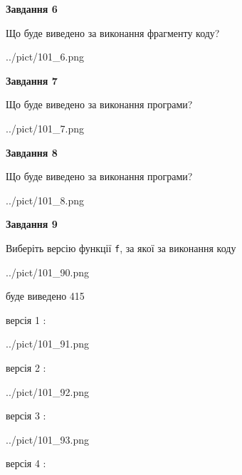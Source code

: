 \documentclass[12pt, ukrainian]{article}
\def\code#1{\Verb!#1!}
\begin{document}
{\begin {large}
{\begin {center}\textbf{Завдання 6}\end {center}}

Що буде виведено за виконання фрагменту коду?\par
\begin{center}
	{../pict/101_6.png}
\end{center}
\newpage

{\begin {center}\textbf{Завдання 7}\end {center}}

Що буде виведено за виконання програми?\par
\begin{center}
	{../pict/101_7.png}
\end{center}
\newpage

{\begin {center}\textbf{Завдання 8}\end {center}}

Що буде виведено за виконання програми?\par
\begin{center}
	{../pict/101_8.png}
\end{center}
\newpage

{\begin {center}\textbf{Завдання 9}\end {center}}

Виберіть версію функції \code{f}, за якої за виконання коду
\begin{center}
	{../pict/101_90.png}
\end{center}
буде виведено 415

\vspace{5mm}
версія 1 :

\begin{center}
	{../pict/101_91.png}
\end{center}
версія 2 :

\begin{center}
	{../pict/101_92.png}
\end{center}
версія 3 :

\begin{center}
	{../pict/101_93.png}
\end{center}
версія 4 :


\end{large}}
\end{document}
